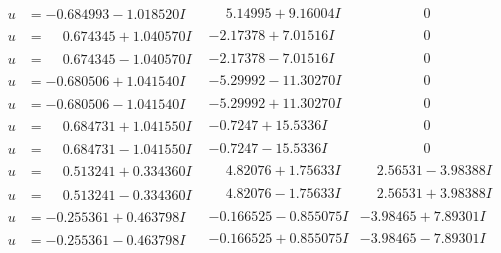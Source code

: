 \documentclass[1p]{elsarticle_modified}
\theoremstyle{definition}
\begin{document}
$$\begin{array}{c|c|c}
\begin{aligned}
u &= -0.684993 - 1.018520 I\end{aligned}
 & \phantom{-}5.14995 + 9.16004 I & \phantom{-0.000000 } 0 \\ \hline\begin{aligned}
u &= \phantom{-}0.674345 + 1.040570 I\end{aligned}
 & -2.17378 + 7.01516 I & \phantom{-0.000000 } 0 \\ \hline\begin{aligned}
u &= \phantom{-}0.674345 - 1.040570 I\end{aligned}
 & -2.17378 - 7.01516 I & \phantom{-0.000000 } 0 \\ \hline\begin{aligned}
u &= -0.680506 + 1.041540 I\end{aligned}
 & -5.29992 - 11.30270 I & \phantom{-0.000000 } 0 \\ \hline\begin{aligned}
u &= -0.680506 - 1.041540 I\end{aligned}
 & -5.29992 + 11.30270 I & \phantom{-0.000000 } 0 \\ \hline\begin{aligned}
u &= \phantom{-}0.684731 + 1.041550 I\end{aligned}
 & -0.7247 + 15.5336 I & \phantom{-0.000000 } 0 \\ \hline\begin{aligned}
u &= \phantom{-}0.684731 - 1.041550 I\end{aligned}
 & -0.7247 - 15.5336 I & \phantom{-0.000000 } 0 \\ \hline\begin{aligned}
u &= \phantom{-}0.513241 + 0.334360 I\end{aligned}
 & \phantom{-}4.82076 + 1.75633 I & \phantom{-}2.56531 - 3.98388 I \\ \hline\begin{aligned}
u &= \phantom{-}0.513241 - 0.334360 I\end{aligned}
 & \phantom{-}4.82076 - 1.75633 I & \phantom{-}2.56531 + 3.98388 I \\ \hline\begin{aligned}
u &= -0.255361 + 0.463798 I\end{aligned}
 & -0.166525 - 0.855075 I & -3.98465 + 7.89301 I \\ \hline\begin{aligned}
u &= -0.255361 - 0.463798 I\end{aligned}
 & -0.166525 + 0.855075 I & -3.98465 - 7.89301 I \\ \hline\begin{aligned}

\end{aligned}
\end{array}$$
\end{document}
